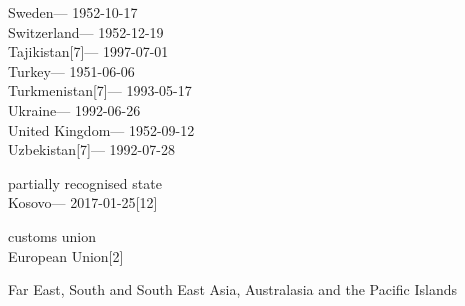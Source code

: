\hspace*{0.333em}Sweden--- 1952-10-17\\
\hspace*{0.333em}\hspace*{0.333em}Switzerland--- 1952-12-19\\
\hspace*{0.333em}Tajikistan{[}7{]}--- 1997-07-01\\
\hspace*{0.333em}Turkey--- 1951-06-06\\
\hspace*{0.333em}Turkmenistan{[}7{]}--- 1993-05-17\\
\hspace*{0.333em}Ukraine--- 1992-06-26\\
\hspace*{0.333em}United Kingdom--- 1952-09-12\\
\hspace*{0.333em}Uzbekistan{[}7{]}--- 1992-07-28

partially recognised state\\
\hspace*{0.333em}Kosovo--- 2017-01-25{[}12{]}

customs union\\
\hspace*{0.333em}European Union{[}2{]}

Far East, South and South East Asia, Australasia and the Pacific Islands


